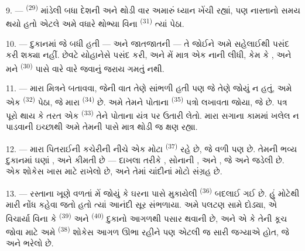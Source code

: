 \VUsaut{3.0mm}

9. ---  \textsuperscript{(29)} 
માંડેલી બધા દેશની  અને  થોડી વાર અમારું
ધ્યાન ખેંચી રહ્યાં, પણ નાસ્તાનો સમય થયો હતો એટલે અમે વધારે થોભ્યા વિના
 \textsuperscript{(31)} ત્યાં પેઠા.

10. --- દુકાનમાં જે બધી  હતી —  અને જાતજાતની  — તે જોઈને અમે સહેલાઈથી પસંદ
કરી શક્યા નહીં. છેવટે યોહાનેસે  પસંદ કરી, અને મેં
માત્ર એક નાની  લીધી, કેમ કે , અને મને  \textsuperscript{(30)}
પાસે વારે વારે જવાનું જરાય ગમતું નથી.

\VUsaut{3.0mm}

11. --- મારા મિત્રને  બતાવવા, જેની વાત તેણે સાંભળી
હતી પણ જે તેણે જોયું ન હતું, અમે એક 
\textsuperscript{(32)} પેઠા, જે મારા 
\textsuperscript{(34)} છે. અમે તેમને પોતાના 
\textsuperscript{(35)} પત્રો લખાવતા જોયા, જે  છે. પત્ર પૂરો થાય કે તરત એક
 \textsuperscript{(33)} તેને પોતાના યંત્ર પર ઉતારી
લેતો. મારા સગાના કામમાં ખલેલ ન પાડવાની ઇચ્છાથી અમે તેમની પાસે માત્ર
થોડી જ ક્ષણ રહ્યા.

12. --- મારા પિતરાઈની કચેરીની નીચે એક મોટા 
\textsuperscript{(37)} રહે છે, જે વળી  પણ છે. તેમની ભવ્ય
દુકાનમાં ઘણાં ,
 અને કીમતી  છે — દાખલા તરીકે
, સોનાની , 
અને , જે  અને  જડેલી છે.
એક શોકેસ ખાસ  માટે રાખેલો છે, અને તેમાં ચાંદીનાં
 મોટો સંગ્રહ છે.

13. --- રસ્તાના ખૂણે વળતાં મેં જોયું કે ઘરના  પાસે
મુકાયેલી  \textsuperscript{(36)} બદલાઈ ગઈ છે. હું મોટેથી
મારી નોંધ કહેવા જતો હતો ત્યાં  આનંદી સૂર
સંભળાયા. અમે પલટણ સામે દોડ્યા, એ વિચાર્યા વિના કે 
 \textsuperscript{(39)} અને 
\textsuperscript{(40)} દુકાનો આગળથી પસાર થવાની છે, અને એ કે તેની કૂચ
જોવા માટે અમે  \textsuperscript{(38)} શોકેસ આગળ
ઊભા રહીને પણ એટલી જ સારી જગ્યાએ હોત, જે  અને  ભરેલો
છે.

